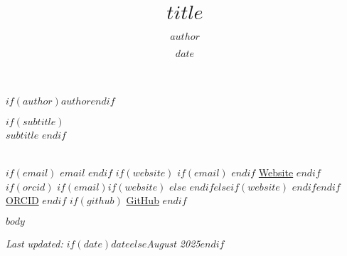 \documentclass[11pt,letterpaper]{article}
\title{$title$}
\author{$author$}
\date{$date$}
\date{}
\begin{document}
\begin{center}
    {\LARGE\bfseries $if(author)$$author$$endif$}
    
    $if(subtitle)$
    \\[0.3\baselineskip]
    {\large\itshape $subtitle$}
    $endif$
    
    \\[0.5\baselineskip]
    
    $if(email)$
    \href{mailto:$email$}{$email$}
    $endif$
    $if(website)$
    $if(email)$ \textbullet{} $endif$
    \href{$website$}{Website}
    $endif$
    $if(orcid)$
    $if(email)$$if(website)$ \textbullet{} $else$ \textbullet{} $endif$$else$$if(website)$ \textbullet{} $endif$$endif$
    \href{$orcid$}{ORCID}
    $endif$
    $if(github)$
    \textbullet{} \href{$github$}{GitHub}
    $endif$
\end{center}

\vspace{0.5\baselineskip}

$body$

\vspace{0.5\baselineskip}
\begin{center}
\small\textit{Last updated: $if(date)$$date$$else$August 2025$endif$}
\end{center}
\end{document}
